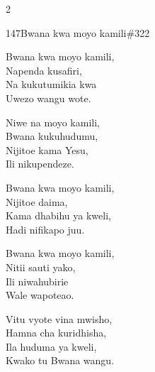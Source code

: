 \documentclass{article}
\begin{document}
\begin{multicols}{2}
\begin{hymn}{147}{Bwana kwa moyo kamili}{\#322}
\begin{stanza}
Bwana kwa moyo kamili,\\
Napenda kusafiri,\\
Na kukutumikia kwa\\
Uwezo wangu wote.
\end{stanza}
\begin{chorus}
Niwe na moyo kamili,\\
Bwana kukuhudumu,\\
Nijitoe kama Yesu,\\
Ili nikupendeze.
\end{chorus}
\begin{stanza}
Bwana kwa moyo kamili,\\
Nijitoe daima,\\
Kama dhabihu ya kweli,\\
Hadi nifikapo juu.
\end{stanza}
\begin{stanza}
Bwana kwa moyo kamili,\\
Nitii sauti yako,\\
Ili niwahubirie\\
Wale wapoteao.
\end{stanza}
\begin{stanza}
Vitu vyote vina mwisho,\\
Hamna cha kuridhisha,\\
Ila huduma ya kweli,\\
Kwako tu Bwana wangu.
\end{stanza}
\end{hymn}


\end{multicols}
\end{document}
